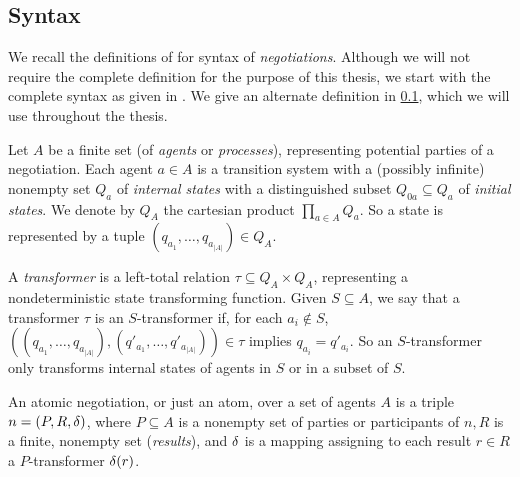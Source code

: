 
\subsection{Syntax}

We recall the definitions of \cite{} for syntax of \textit{negotiations}. Although we will not require the complete definition for the purpose of this thesis, we start with the complete syntax as given in \cite{}. We give an alternate definition in \ref{}, which we will use throughout the thesis.

Let $A$ be a finite set (of \textit{agents} or \textit{processes}), representing potential parties of a negotiation. Each agent $a \in A$ is a transition system with a (possibly infinite) nonempty set $Q_a$ of \textit{internal states} with a distinguished subset $Q_{0a} \subseteq Q_a$ of \textit{initial states}. We denote by $Q_A$ the cartesian product $\prod_{a \in A} Q_a$. So a state is represented by a tuple $(q_{a_1}, \dots, q_{a_{|A|}}) \in Q_A$. 


A \textit{transformer} is a left-total relation $\tau \subseteq Q_A \times Q_A$, representing a nondeterministic state transforming function. Given $S \subseteq A$, we say that a transformer $\tau$ is an $S$-transformer if, for each $a_i \notin S$, $((q_{a_1}, \dots, q_{a_{|A|}}),(q'_{a_1}, \dots, q'_{a_{|A|}})) \in \tau$ implies $q_{a_i} = q'_{a_i}$. So an $S$-transformer only transforms internal states of agents in $S$ or in a subset of $S$.


\begin{definition}
An \textsf{atomic negotiation}, or just an atom, over a set of agents $A$ is a triple $n = (P, R, \delta)$, where $P \subseteq A$ is a nonempty set of parties or participants of $n, R$ is a finite, nonempty set (\textit{results}), and $\delta$ is a mapping assigning to each result $r \in R$ a $P$-transformer $\delta(r)$.
\end{definition}

